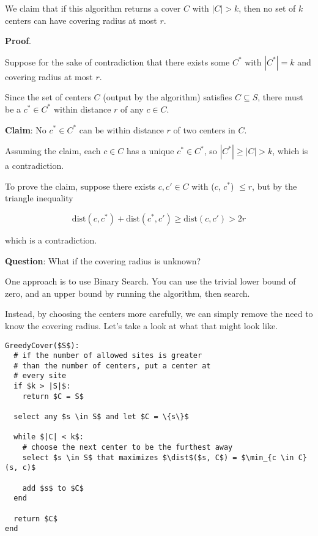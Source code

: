 \documentclass[12pt]{article}
\def\dist{\text{dist}}
\begin{document}
  We claim that if this algorithm returns a cover $C$ with $|C| > k$, then no
  set of $k$ centers can have covering radius at most $r$.

  {\bf Proof}.

  Suppose for the sake of contradiction that there exists some $C^*$ with $|C^*|
  = k$ and covering radius at most $r$.

  Since the set of centers $C$ (output by the algorithm) satisfies $C \subseteq
  S$, there must be a $c^* \in C^*$ within distance $r$ of any $c \in C$.

  {\bf Claim}: No $c^* \in C^*$ can be within distance $r$ of two centers in
  $C$.

  Assuming the claim, each $c \in C$ has a unique $c^* \in C^*$, so $|C^*| \ge
  |C| > k$, which is a contradiction.

  To prove the claim, suppose there exists $c, c' \in C$ with \dist($c$,
  $c^*$) $\le r$, but by the triangle inequality

  \[
    \dist(c, c^*) + \dist(c^*, c') \ge \dist(c, c') > 2r
  \]

  which is a contradiction.


  {\bf Question}: What if the covering radius is unknown?

  One approach is to use Binary Search. You can use the trivial lower bound of
  zero, and an upper bound by running the algorithm, then search.

  Instead, by choosing the centers more carefully, we can simply remove the need
  to know the covering radius. Let's take a look at what that might look like.

  \begin{lstlisting}[]
GreedyCover($S$):
  # if the number of allowed sites is greater
  # than the number of centers, put a center at
  # every site
  if $k > |S|$:
    return $C = S$

  select any $s \in S$ and let $C = \{s\}$

  while $|C| < k$:
    # choose the next center to be the furthest away
    select $s \in S$ that maximizes $\dist$($s, C$) = $\min_{c \in C}(s, c)$

    add $s$ to $C$
  end

  return $C$
end
  \end{lstlisting}
\end{document}
